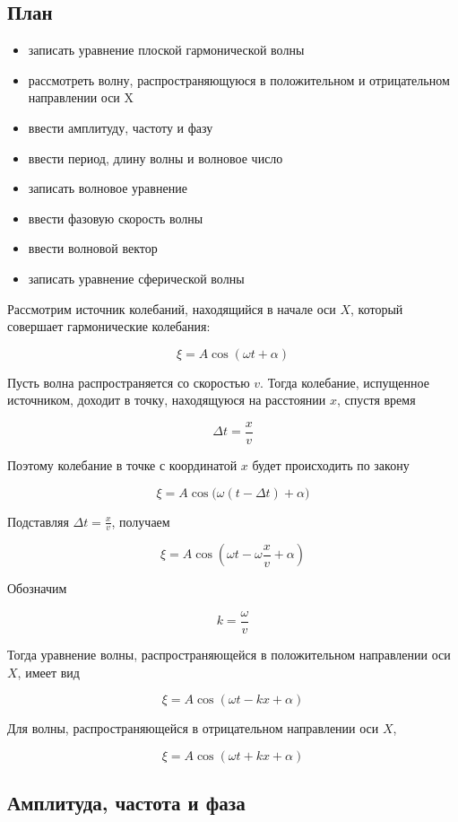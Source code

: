 \documentclass[a4paper,12pt]{article}
\begin{document}
\subsection*{План}
\begin{itemize}
\item записать уравнение плоской гармонической волны
\item рассмотреть волну, распространяющуюся в положительном и отрицательном направлении оси X
\item ввести амплитуду, частоту и фазу
\item ввести период, длину волны и волновое число
\item записать волновое уравнение
\item ввести фазовую скорость волны
\item ввести волновой вектор
\item записать уравнение сферической волны
\end{itemize}

Рассмотрим источник колебаний, находящийся в начале оси \(X\), который совершает гармонические колебания:

\[
\xi = A \cos(\omega t + \alpha)
\]

Пусть волна распространяется со скоростью \(v\). Тогда колебание, испущенное источником, доходит в точку, находящуюся на расстоянии \(x\), спустя время

\[
\Delta t = \frac{x}{v}
\]

Поэтому колебание в точке с координатой \(x\) будет происходить по закону

\[
\xi = A \cos\bigl(\omega(t-\Delta t) + \alpha\bigr)
\]

Подставляя \(\Delta t = \frac{x}{v}\), получаем

\[
\xi = A \cos\left(\omega t - \omega \frac{x}{v} + \alpha\right)
\]

Обозначим

\[
k = \frac{\omega}{v}
\]

Тогда уравнение волны, распространяющейся в положительном направлении оси \(X\), имеет вид

\[
\xi = A \cos(\omega t - kx + \alpha)
\]

Для волны, распространяющейся в отрицательном направлении оси \(X\),

\[
\xi = A \cos(\omega t + kx + \alpha)
\]

\subsection*{Амплитуда, частота и фаза}
\end{document}
